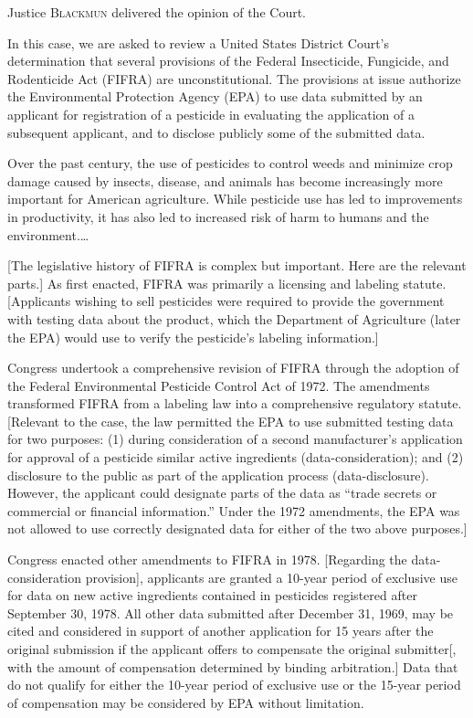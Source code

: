 
\opinion Justice \textsc{Blackmun} delivered the opinion of the Court.

In this case, we are asked to review a United States District Court's
determination that several provisions of the Federal Insecticide, Fungicide, and
Rodenticide Act (FIFRA)
are unconstitutional. The provisions at issue authorize the Environmental
Protection Agency (EPA) to use data submitted by an applicant for registration
of a pesticide in evaluating the application of a subsequent applicant,
and to disclose publicly some of the submitted data.




Over the past century, the use of pesticides to control weeds and minimize crop
damage caused by insects, disease, and animals has become increasingly more
important for American agriculture.
While pesticide use has led to improvements in productivity, it has also led to
increased risk of harm to humans and the environment.\ldots

[The legislative history of FIFRA is complex but important. Here are the
relevant parts.]
As first enacted, FIFRA was primarily a licensing and labeling statute.
[Applicants wishing to sell pesticides were required to provide the government
with testing data about the product, which the Department of Agriculture (later
the EPA) would use to verify the pesticide's labeling information.]


Congress undertook a comprehensive revision of FIFRA through
the adoption of the Federal Environmental Pesticide Control Act of 1972.
The amendments transformed FIFRA from a labeling law into a
comprehensive regulatory statute. [Relevant to the case, the law permitted the
EPA to use submitted testing data for two purposes: (1)
during consideration of a second manufacturer's application for approval
of a pesticide similar active ingredients
(data-consideration); and
(2) disclosure to the public as part of the application process
(data-disclosure).
However, the applicant could designate parts of the data as ``trade secrets or
commercial or financial information.'' Under the 1972 amendments, the EPA was
not allowed to use correctly designated data for either of the two above
purposes.]

Congress enacted other amendments to FIFRA in 1978. [Regarding the
data-consideration provision],
applicants are granted a 10-year period of exclusive use for data on new active
ingredients contained in pesticides registered after September 30, 1978. All
other data submitted after December 31, 1969, may be cited and considered in
support of another application for 15 years after the original submission if the
applicant offers to compensate the original submitter[, with the amount of
compensation determined by binding arbitration.] Data that do not qualify for
either the 10-year period of exclusive use or the 15-year period of compensation
may be considered by EPA without limitation.

